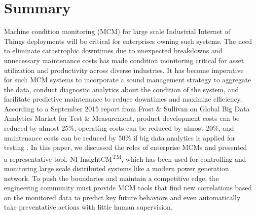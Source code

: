 \section{Summary}

Machine condition monitoring (MCM) for large scale Industrial Internet of Things deployments will be critical for enterprises owning such systems.
The need to eliminate catastrophic downtimes due to unexpected breakdowns and unnecessary maintenance costs has made condition monitoring critical for asset utilization and productivity across diverse industries.
It has become imperative for such MCM systems to incorporate a sound management strategy to aggregate the data, conduct diagnostic analytics about the condition of the system, and facilitate predictive maintenance to reduce downtimes and maximize efficiency.
According to a September 2015 report from Frost \& Sullivan on Global Big Data Analytics Market for Test \& Measurement, product development costs can be reduced by almost 25\%, operating costs can be reduced by almost 20\%, and maintenance costs can be reduced by 50\% if big data analytics is applied for testing \cite{NITrendWatch2016}. 
In this paper, we discussed the roles of enterprise MCMs and presented a representative tool, NI InsightCM\textsuperscript{TM}, which has been used for controlling and monitoring large scale distributed systems like a modern power generation network. 
To push the boundaries and maintain a competitive edge, the engineering community must provide MCM tools that find new correlations based on the monitored data to predict key future behaviors and even automatically take preventative actions with little human supervision.

